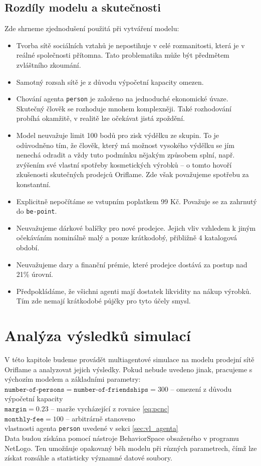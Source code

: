 \documentclass[a4wide,12pt]{report}
\begin{document}
\section{Rozdíly modelu a skutečnosti}
Zde shrneme zjednodušení použitá při vytváření modelu:
\begin{itemize}
\item Tvorba sítě sociálních vztahů je nepostihuje v celé rozmanitosti, která je v reálné společnosti přítomna. Tato problematika může být předmětem zvláštního zkoumání.
\item Samotný rozsah sítě je z důvodu výpočetní kapacity omezen.
\item Chování agenta \texttt{person} je založeno na jednoduché ekonomické úvaze. Skutečný člověk se rozhoduje mnohem komplexněji. Také rozhodování probíhá okamžitě, v realitě lze očekávat jistá zpoždění.
\item Model neuvažuje limit 100 bodů pro zisk výdělku ze skupin. To je odůvodněno tím, že člověk, který má možnost vysokého výdělku se jím nenechá odradit a vždy tuto podmínku nějakým způsobem splní, např. zvýšením své vlastní spotřeby kosmetických výrobků -- o tomto hovoří zkušenosti skutečných prodejců Oriflame. Zde však považujeme spotřebu za konstantní.
\item Explicitně nepočítáme se vstupním poplatkem 99 Kč. Považuje se za zahrnutý do \texttt{be-point}.
\item Neuvažujeme dárkové balíčky pro nové prodejce. Jejich vliv vzhledem k jiným očekáváním nominálně malý a pouze krátkodobý, přibližně 4 katalogová období.
\item Neuvažujeme dary a finanční prémie, které prodejce dostává za postup nad 21\% úrovní.
\item Předpokládáme, že všichni agenti mají dostatek likvidity na nákup výrobků. Tím zde nemají krátkodobé půjčky pro tyto účely smysl.
\end{itemize}
%
%
%
\chapter{Analýza výsledků simulací}
V této kapitole budeme provádět multiagentové simulace na modelu prodejní sítě Oriflame a analyzovat jejich výsledky. Pokud nebude uvedeno jinak, pracujeme s výchozím modelem a základními parametry:\\[3mm]
$\texttt{number-of-persons}=\texttt{number-of-friendships}=300$ -- omezení z důvodu výpočetní kapacity\\
$\texttt{margin}=0.23$ -- marže vycházející z rovnice \ref{eq:pcnc}\\
$\texttt{monthly-fee}=100$ -- arbitrárně stanoveno\\
vlastnosti agenta \texttt{person} uvedené v sekci \ref{sec:vl_agenta}\\[3mm]
Data budou získána pomocí nástroje BehaviorSpace obsaženého v programu NetLogo. Ten umožňuje opakovaný běh modelu při různých parametrech, čímž lze získat rozsáhle a statisticky významné datové soubory.
\end{document}
